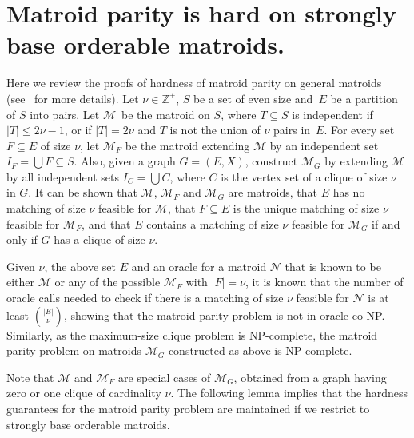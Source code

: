 \documentclass[letterpaper,11pt]{article}
\newcommand{\Integ}{{\mathbb Z}}
\newcommand{\M}{\mathcal{M}}
\theoremstyle{definition}
\begin{document}
\section{Matroid parity is hard on strongly base orderable matroids.}
Here we review the proofs of hardness of matroid parity on general matroids (see~\cite[Section 43.9]{Schrijver-book} for more details).
Let $\nu \in \Integ^+$, $S$ be a set of even size and~$E$ be a partition of $S$ into pairs. Let $\M$~be the matroid on $S$, where $T \subseteq S$ is independent if $|T|\leq 2\nu -1$, or if $|T|=2\nu$ and $T$ is not the union of $\nu$ pairs in~$E$. For every set $F \subseteq E$ of size $\nu$, let $\M_F$ be the matroid extending $\M$ by an independent set $I_F=\bigcup F\subseteq S$. Also, given a graph $G=(E,X)$, construct $\M_G$ by extending $\M$ by all independent sets $I_C = \bigcup C$, where $C$ is the vertex set of a clique of size $\nu$ in $G$. It can be shown that $\M$, $\M_F$ and $\M_G$ are matroids, that $E$ has no matching of size $\nu$ feasible for $\M$, that $F\subseteq E$ is the unique matching of size $\nu$ feasible for $\M_F$, and that $E$ contains a matching of size $\nu$ feasible for $\M_G$ if and only if $G$ has a clique of size $\nu$.

Given $\nu$, the above set $E$ and an oracle for a matroid $\mathcal{N}$ that is known to be either $\M$ or any of the possible $\M_F$ with $|F|=\nu$, it is known that the number of oracle calls needed to check if there is a matching of size $\nu$ feasible for $\mathcal{N}$ is at least $\binom{|E|}{\nu}$, showing that the matroid parity problem is not in oracle co-NP. Similarly, as the maximum-size clique problem is NP-complete, the matroid parity problem on matroids $\M_G$ constructed as above is NP-complete.

Note that $\M$ and $\M_F$ are special cases of $\M_G$, obtained from a graph having zero or one clique of cardinality $\nu$. The following lemma implies that the hardness guarantees for the matroid parity problem are maintained if we restrict to strongly base orderable matroids.
\end{document}
